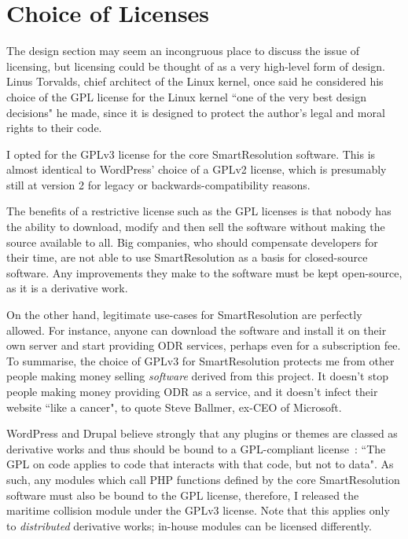 \section{Choice of Licenses}

The design section may seem an incongruous place to discuss the issue of licensing, but licensing could be thought of as a very high-level form of design. Linus Torvalds, chief architect of the Linux kernel, once said he considered his choice of the GPL license for the Linux kernel ``one of the very best design decisions" he made, since it is designed to protect the author's legal and moral rights to their code.~\cite{linusLinux}

I opted for the GPLv3 license for the core SmartResolution software. This is almost identical to WordPress' choice of a GPLv2 license, which is presumably still at version 2 for legacy or backwards-compatibility reasons.

The benefits of a restrictive license such as the GPL licenses is that nobody has the ability to download, modify and then sell the software without making the source available to all. Big companies, who should compensate developers for their time, are not able to use SmartResolution as a basis for closed-source software. Any improvements they make to the software must be kept open-source, as it is a derivative work.

On the other hand, legitimate use-cases for SmartResolution are perfectly allowed. For instance, anyone can download the software and install it on their own server and start providing ODR services, perhaps even for a subscription fee. To summarise, the choice of GPLv3 for SmartResolution protects me from other people making money selling \emph{software} derived from this project. It doesn't stop people making money providing ODR as a service, and it doesn't infect their website ``like a cancer", to quote Steve Ballmer, ex-CEO of Microsoft.~\cite{linuxCancer}

WordPress and Drupal believe strongly that any plugins or themes are classed as derivative works and thus should be bound to a GPL-compliant license~\cite{wordpress:gpl}: ``The GPL on code applies to code that interacts with that code, but not to data". As such, any modules which call PHP functions defined by the core SmartResolution software must also be bound to the GPL license, therefore, I released the maritime collision module under the GPLv3 license. Note that this applies only to \emph{distributed} derivative works; in-house modules can be licensed differently.

